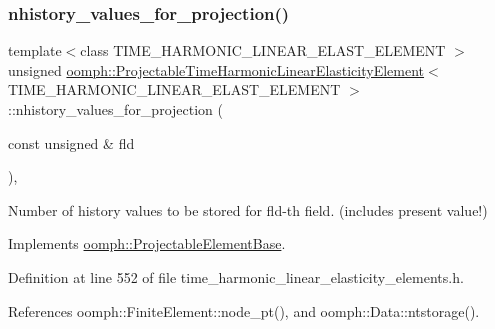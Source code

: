 \subsubsection{\texorpdfstring{nhistory\+\_\+values\+\_\+for\+\_\+projection()}{nhistory\_values\_for\_projection()}}
{\footnotesize\ttfamily template$<$class T\+I\+M\+E\+\_\+\+H\+A\+R\+M\+O\+N\+I\+C\+\_\+\+L\+I\+N\+E\+A\+R\+\_\+\+E\+L\+A\+S\+T\+\_\+\+E\+L\+E\+M\+E\+NT $>$ \\
unsigned \hyperlink{classoomph_1_1ProjectableTimeHarmonicLinearElasticityElement}{oomph\+::\+Projectable\+Time\+Harmonic\+Linear\+Elasticity\+Element}$<$ T\+I\+M\+E\+\_\+\+H\+A\+R\+M\+O\+N\+I\+C\+\_\+\+L\+I\+N\+E\+A\+R\+\_\+\+E\+L\+A\+S\+T\+\_\+\+E\+L\+E\+M\+E\+NT $>$\+::nhistory\+\_\+values\+\_\+for\+\_\+projection (\begin{DoxyParamCaption}\item[{const unsigned \&}]{fld }\end{DoxyParamCaption})\hspace{0.3cm}{\ttfamily [inline]}, {\ttfamily [virtual]}}



Number of history values to be stored for fld-\/th field. (includes present value!) 



Implements \hyperlink{classoomph_1_1ProjectableElementBase_ac6790f394630b964663281f8740f43a5}{oomph\+::\+Projectable\+Element\+Base}.



Definition at line 552 of file time\+\_\+harmonic\+\_\+linear\+\_\+elasticity\+\_\+elements.\+h.



References oomph\+::\+Finite\+Element\+::node\+\_\+pt(), and oomph\+::\+Data\+::ntstorage().

\mbox{\label{classoomph_1_1ProjectableTimeHarmonicLinearElasticityElement_acda6973da9b435f90d5e5be2f30836a6}} 
